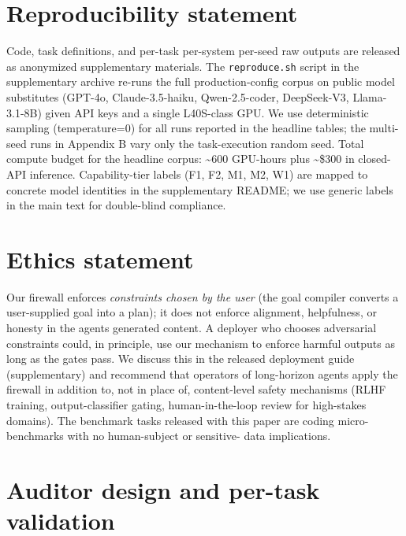 \section{Reproducibility statement}\label{reproducibility-statement}

Code, task definitions, and per-task per-system per-seed raw outputs are released as anonymized
supplementary materials. The \texttt{reproduce.sh} script in the supplementary archive re-runs the full
production-config corpus on public model substitutes (GPT-4o, Claude-3.5-haiku, Qwen-2.5-coder,
DeepSeek-V3, Llama-3.1-8B) given API keys and a single L40S-class GPU. We use deterministic
sampling (temperature=0) for all runs reported in the headline tables; the multi-seed runs in
Appendix B vary only the task-execution random seed. Total compute budget for the headline
corpus: \textasciitilde600 GPU-hours plus \textasciitilde\$300 in closed-API inference. Capability-tier labels (F1, F2, M1,
M2, W1) are mapped to concrete model identities in the supplementary README; we use generic
labels in the main text for double-blind compliance.



\section{Ethics statement}\label{ethics-statement}

Our firewall enforces \emph{constraints chosen by the user} (the goal compiler converts a user-supplied
goal into a plan); it does not enforce alignment, helpfulness, or honesty in the agent\textquotesingle s
generated content. A deployer who chooses adversarial constraints could, in principle, use our
mechanism to enforce harmful outputs as long as the gates pass. We discuss this in the released
deployment guide (supplementary) and recommend that operators of long-horizon agents apply the
firewall in addition to, not in place of, content-level safety mechanisms (RLHF training,
output-classifier gating, human-in-the-loop review for high-stakes domains). The benchmark
tasks released with this paper are coding micro-benchmarks with no human-subject or sensitive-
data implications.




\appendix

\section{Auditor design and per-task validation}\label{app:auditor-validation}

